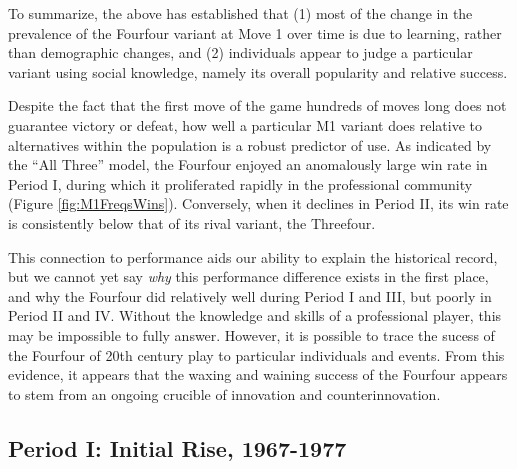 To summarize, the above has established that (1) most of the change in the prevalence of the Fourfour variant at Move 1 over time is due to learning, rather than demographic changes, and (2) individuals appear to judge a particular variant using social knowledge, namely its overall popularity and relative success.

Despite the fact that the first move of the game hundreds of moves long does not guarantee victory or defeat, how well a particular M1 variant does relative to alternatives within the population is a robust predictor of use.  As indicated by the ``All Three'' model, the Fourfour enjoyed an anomalously large win rate in Period I, during which it proliferated rapidly in the professional community (Figure \ref{fig:M1FreqsWins}).  Conversely, when it declines in Period II, its win rate is consistently below that of its rival variant, the Threefour.

This connection to performance aids our ability to explain the historical record, but we cannot yet say \textit{why} this performance difference exists in the first place, and why the Fourfour did relatively well during Period I and III, but poorly in Period II and IV.  Without the knowledge and skills of a professional player, this may be impossible to fully answer.  However, it is possible to trace the sucess of the Fourfour of 20th century play to particular individuals and events.  From this evidence, it appears that the waxing and waining success of the Fourfour appears to stem from an ongoing crucible of innovation and counterinnovation.

\subsection{Period I: Initial Rise, 1967-1977}

